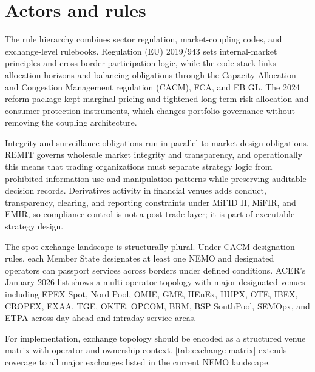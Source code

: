 \documentclass[oneside,10pt]{swissi}
\begin{document}
\section{Actors and rules}
The rule hierarchy combines sector regulation, market-coupling codes, and exchange-level rulebooks. Regulation (EU) 2019/943 sets internal-market principles and cross-border participation logic, while the code stack links allocation horizons and balancing obligations through the Capacity Allocation and Congestion Management regulation (CACM), FCA, and EB GL. The 2024 reform package kept marginal pricing and tightened long-term risk-allocation and consumer-protection instruments, which changes portfolio governance without removing the coupling architecture.\cite{eu_reg_2019_943,ec_network_codes_2026,eu_reg_2016_1719,ec_electricity_market_design_2026}

Integrity and surveillance obligations run in parallel to market-design obligations. REMIT governs wholesale market integrity and transparency, and operationally this means that trading organizations must separate strategy logic from prohibited-information use and manipulation patterns while preserving auditable decision records. Derivatives activity in financial venues adds conduct, transparency, clearing, and reporting constraints under MiFID II, MiFIR, and EMIR, so compliance control is not a post-trade layer; it is part of executable strategy design.\cite{eu_reg_2011_1227_remit,eu_dir_2014_65_mifid2,eu_reg_2014_600_mifir,eu_reg_2012_648_emir}

The spot exchange landscape is structurally plural. Under CACM designation rules, each Member State designates at least one NEMO and designated operators can passport services across borders under defined conditions. ACER's January 2026 list shows a multi-operator topology with major designated venues including EPEX Spot, Nord Pool, OMIE, GME, HEnEx, HUPX, OTE, IBEX, CROPEX, EXAA, TGE, OKTE, OPCOM, BRM, BSP SouthPool, SEMOpx, and ETPA across day-ahead and intraday service areas.\cite{acer_nemo_designation_2026,acer_nemo_list_jan_2026}

For implementation, exchange topology should be encoded as a structured venue matrix with operator and ownership context. \cref{tab:exchange-matrix} extends coverage to all major exchanges listed in the current NEMO landscape.\cite{acer_nemo_list_jan_2026}
\end{document}
